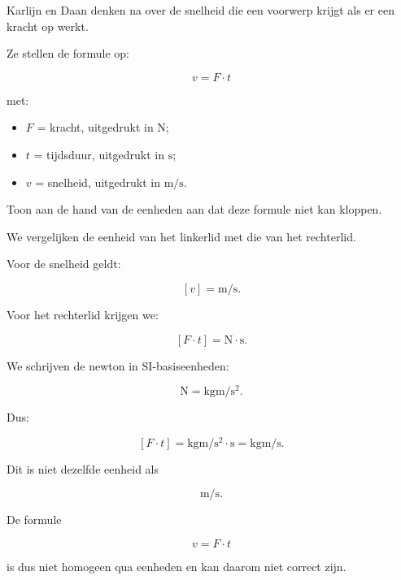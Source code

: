 \documentclass{ximera}
\begin{document}

\begin{oefening}{\oefB\ESS}

Karlijn en Daan denken na over de snelheid die een voorwerp krijgt als er een kracht op werkt.

Ze stellen de formule op:

\[
v = F \cdot t
\]

met:

\begin{itemize}
    \item $F$ = kracht, uitgedrukt in $\si{\newton}$;
    \item $t$ = tijdsduur, uitgedrukt in $\si{\second}$;
    \item $v$ = snelheid, uitgedrukt in $\si{\meter\per\second}$.
\end{itemize}

\begin{question}
Toon aan de hand van de eenheden aan dat deze formule niet kan kloppen.

\begin{oplossing}
We vergelijken de eenheid van het linkerlid met die van het rechterlid.

Voor de snelheid geldt:

\[
[v] = \si{\meter\per\second}.
\]

Voor het rechterlid krijgen we:

\[
[F \cdot t]
=
\si{\newton}\cdot\si{\second}.
\]

We schrijven de newton in SI-basiseenheden:

\[
\si{\newton}
=
\si{\kilogram\meter\per\second\squared}.
\]

Dus:

\[
[F \cdot t]
=
\si{\kilogram\meter\per\second\squared}
\cdot
\si{\second}
=
\si{\kilogram\meter\per\second}.
\]

Dit is niet dezelfde eenheid als

\[
\si{\meter\per\second}.
\]

De formule

\[
v = F \cdot t
\]

is dus niet homogeen qua eenheden en kan daarom niet correct zijn.
\end{oplossing}
\end{question}



\end{oefening}
\end{document}
